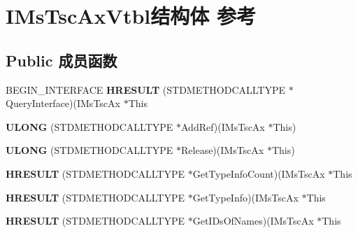 \hypertarget{struct_i_ms_tsc_ax_vtbl}{}\section{I\+Ms\+Tsc\+Ax\+Vtbl结构体 参考}
\label{struct_i_ms_tsc_ax_vtbl}
\subsection*{Public 成员函数}
\begin{DoxyCompactItemize}
\item 
\mbox{\label{struct_i_ms_tsc_ax_vtbl_a594d6e6ef7df9bd962c1c9514d0931f2}} 
B\+E\+G\+I\+N\+\_\+\+I\+N\+T\+E\+R\+F\+A\+CE {\bfseries H\+R\+E\+S\+U\+LT} (S\+T\+D\+M\+E\+T\+H\+O\+D\+C\+A\+L\+L\+T\+Y\+PE $\ast$Query\+Interface)(I\+Ms\+Tsc\+Ax $\ast$This
\item 
\mbox{\label{struct_i_ms_tsc_ax_vtbl_a347182a775dd7db91109e23110432007}} 
{\bfseries U\+L\+O\+NG} (S\+T\+D\+M\+E\+T\+H\+O\+D\+C\+A\+L\+L\+T\+Y\+PE $\ast$Add\+Ref)(I\+Ms\+Tsc\+Ax $\ast$This)
\item 
\mbox{\label{struct_i_ms_tsc_ax_vtbl_a4a95618482c2a91fa01823290c9b4581}} 
{\bfseries U\+L\+O\+NG} (S\+T\+D\+M\+E\+T\+H\+O\+D\+C\+A\+L\+L\+T\+Y\+PE $\ast$Release)(I\+Ms\+Tsc\+Ax $\ast$This)
\item 
\mbox{\label{struct_i_ms_tsc_ax_vtbl_a1417abc3fd2b2ca2965a8dc2d57def0f}} 
{\bfseries H\+R\+E\+S\+U\+LT} (S\+T\+D\+M\+E\+T\+H\+O\+D\+C\+A\+L\+L\+T\+Y\+PE $\ast$Get\+Type\+Info\+Count)(I\+Ms\+Tsc\+Ax $\ast$This
\item 
\mbox{\label{struct_i_ms_tsc_ax_vtbl_adf7024877e100b4350830056a97eebff}} 
{\bfseries H\+R\+E\+S\+U\+LT} (S\+T\+D\+M\+E\+T\+H\+O\+D\+C\+A\+L\+L\+T\+Y\+PE $\ast$Get\+Type\+Info)(I\+Ms\+Tsc\+Ax $\ast$This
\item 
\mbox{\label{struct_i_ms_tsc_ax_vtbl_ac85b48ee4ab75cdfc9ec71664dc1c606}} 
{\bfseries H\+R\+E\+S\+U\+LT} (S\+T\+D\+M\+E\+T\+H\+O\+D\+C\+A\+L\+L\+T\+Y\+PE $\ast$Get\+I\+Ds\+Of\+Names)(I\+Ms\+Tsc\+Ax $\ast$This
\item 
\mbox{\label{struct_i_ms_tsc_ax_vtbl_a89df322574d46e760a9fd5ca36a7ad7b}} 

\end{DoxyCompactItemize}
